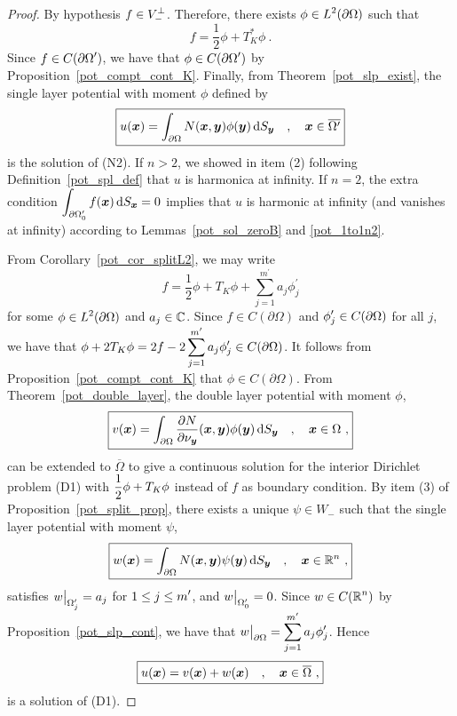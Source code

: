 \begin{proof}
By hypothesis $\displaystyle f \in V_-^\perp$.  Therefore, there exists
$\displaystyle \phi \in L^2(\partial \Omega)$ such that
\[
\boxed{
f = \frac{1}{2}\phi +T^\ast_K \phi \ .
}
\]
Since $\displaystyle f\in C(\partial \Omega^{\prime})$, we have that
$\displaystyle \phi \in C(\partial \Omega^{\prime})$ by
Proposition~\ref{pot_compt_cont_K}.
Finally, from Theorem~\ref{pot_slp_exist}, the single layer potential 
with moment $\phi$ defined by
\[
\boxed{
u({\bm{x}}) = \int_{\partial \Omega} N({\bm{x}},{\bm{y}})
\phi({\bm{y}}) \,\mathrm{d}{S}_{{\bm{y}}} \quad , \quad {\bm{x}} \in \overline{\Omega^{\prime}}
}
\]
is the solution of (N2).  If $n>2$, we showed in item (2) following
Definition~\ref{pot_spl_def} that $u$ is harmonica at infinity.  If
$n=2$, the extra condition
$\displaystyle \int_{\partial \Omega_0^{\prime}} f({\bm{x}})\,\mathrm{d}{S}_{{\bm{x}}} = 0$ 
implies that $u$ is harmonic at infinity (and vanishes at infinity)
according to Lemmas~\ref{pot_sol_zeroB} and \ref{pot_1to1n2}.

 From Corollary~\ref{pot_cor_splitL2}, we may write
\[
\boxed{
f = \frac{1}{2} \phi + T_K \phi + \sum_{j=1}^{m^{\prime}} a_j \phi_j^{\prime}
}
\]
for some $\displaystyle \phi \in L^2(\partial \Omega)$ and $a_j \in \mathbb{C}$.
Since $f\in C(\partial \Omega)$ and
$\displaystyle \phi_j^{\prime} \in C(\partial \Omega)$
for all $j$, we have that
$\displaystyle
\phi + 2T_K \phi = 2f - 2 \sum_{j=1}^{m^{\prime}} a_j \phi_j^{\prime}
\in C(\partial \Omega)$.
It follows from Proposition~\ref{pot_compt_cont_K} that
$\phi \in C(\partial \Omega)$.  From Theorem~\ref{pot_double_layer},
the double layer potential with moment $\phi$,
\[
\boxed{
v({\bm{x}}) = \int_{\partial \Omega}
\frac{\partial{N}}{\partial \nu_{{\bm{y}}}}({\bm{x}},{\bm{y}}) \phi({\bm{y}})
\,\mathrm{d}{S}_{{\bm{y}}} \quad , \quad {\bm{x}} \in \Omega \ ,
}
\]
can be extended to $\overline{\Omega}$ to give a continuous solution for the
interior Dirichlet problem (D1) with 
$\displaystyle \frac{1}{2} \phi + T_K \phi$ instead of $f$ as boundary
condition.
By item (3) of Proposition~\ref{pot_split_prop}, there
exists a unique $\psi \in W_-$ such that the single layer potential
with moment $\psi$,
\[
\boxed{
w({\bm{x}}) = \int_{\partial \Omega} N({\bm{x}},{\bm{y}})
\psi({\bm{y}}) \,\mathrm{d}{S}_{{\bm{y}}} \quad , \quad {\bm{x}} \in \mathbb{R}^n \ ,
}
\]
satisfies $\displaystyle w\big|_{\Omega_j^{\prime}} = a_j$ for
$\displaystyle 1\leq j \leq m^{\prime}$, and
$\displaystyle w\big|_{\Omega_0^{\prime}} = 0$.
Since $\displaystyle w \in C(\mathbb{R}^n)$ by
Proposition~\ref{pot_slp_cont}, we have that
$\displaystyle 
w\big|_{\partial \Omega} = \sum_{j=1}^{m^{\prime}} a_j \phi_j^{\prime}$.
Hence
\[
\boxed{
u({\bm{x}}) = v({\bm{x}}) + w({\bm{x}}) \quad , \quad {\bm{x}} \in
\overline{\Omega} \ ,
}
\]
is a solution of (D1).


\end{proof}
